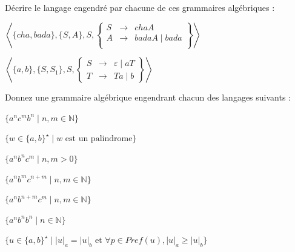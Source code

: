 
\begingroup

\begin{exercice}\label{exo:parsing/grammars/revision}

  Décrire le langage engendré par chacune de ces grammaires algébriques :
  \begin{questions}
  \item $\left\langle \{cha, bada\}, \{S, A\}, S,
    \left\{\begin{array}{rcl}
    S   &\rightarrow& chaA\\
    A   &\rightarrow& badaA \mid  bada \\
    \end{array}\right\}  \right\rangle$
  \item $\left\langle \{a, b\}, \{S, S_1\}, S,
    \left\{\begin{array}{rcl}
    S   &\rightarrow& \varepsilon \mid  a T\\
    T &\rightarrow& T a \mid  b
    \end{array}\right\}  \right\rangle$
  \end{questions}

  Donnez une grammaire algébrique engendrant chacun des langages suivants :
  \begin{questions}
  \item $\{a^n c^m b^n \mid n, m \in \mathbb{N}\}$
  \item $\{w \in \{a, b\}^\star  \mid  w \mbox{ est un palindrome}\}$
  \item $\{a^n b^n c^m \mid n, m > 0\}$
  \item $\{a^n b^m c^{n+m} \mid n, m  \in \mathbb{N}\}$
  \item $\{a^n b^{n+m} c^m \mid n, m  \in \mathbb{N}\}$
  \item $\{a^n b^n b^n \mid  n \in \mathbb{N} \}$
  \item $\{ u \in \{a, b\}^\star \mid |u|_a = |u|_b \text{ et } \forall p \in \mathit{Pref}(u), |u|_a \ge |u|_b\}$
  \end{questions}

\end{exercice}

